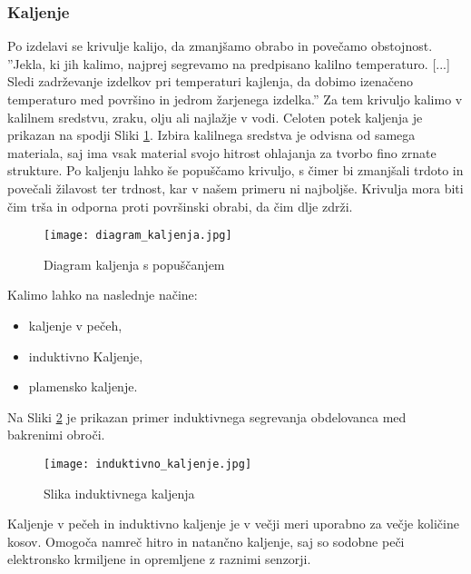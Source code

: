 \subsubsection{Kaljenje}
Po izdelavi se krivulje kalijo, da zmanjšamo obrabo in povečamo
obstojnost. ''Jekla, ki jih kalimo, najprej segrevamo na predpisano
kalilno temperaturo. [...] Sledi zadrževanje izdelkov pri temperaturi
kajlenja, da dobimo izenačeno temperaturo med površino in jedrom
žarjenega izdelka.'' \cite{gradiva}
Za tem krivuljo kalimo v kalilnem sredstvu, zraku, olju ali najlažje
v vodi. Celoten potek kaljenja je prikazan na spodji Sliki \ref{diagram_kaljenja}.
Izbira kalilnega sredstva je odvisna od samega materiala,
saj ima vsak material svojo hitrost ohlajanja za tvorbo fino zrnate strukture.
Po kaljenju lahko še popuščamo krivuljo, s čimer bi zmanjšali trdoto
in povečali žilavost ter trdnost, kar v našem primeru ni najboljše.
Krivulja mora biti čim trša in odporna proti površinski obrabi,
da čim dlje zdrži.

\begin{figure}[H]
	\begin{center}
		\texttt{[image: diagram\_kaljenja.jpg]}
		\caption{Diagram kaljenja s popuščanjem
			\cite{diagram_kaljenja}}
		\label{diagram_kaljenja}
	\end{center}
\end{figure}

Kalimo lahko na naslednje načine:
\begin{itemize}
	\item kaljenje v pečeh,
	\item induktivno Kaljenje,
	\item plamensko kaljenje.
\end{itemize}

Na Sliki \ref{induktivno_kaljenje} je prikazan primer induktivnega
segrevanja obdelovanca med bakrenimi obroči.

\begin{figure}[H]
	\begin{center}
		\texttt{[image: induktivno\_kaljenje.jpg]}
		\caption{Slika induktivnega kaljenja
			\cite{induktivno_kaljenje}}
		\label{induktivno_kaljenje}
	\end{center}
\end{figure}

Kaljenje v pečeh in induktivno kaljenje je v večji meri uporabno
za večje količine kosov. Omogoča namreč hitro in natančno kaljenje,
saj so sodobne peči elektronsko krmiljene in opremljene z raznimi senzorji.

